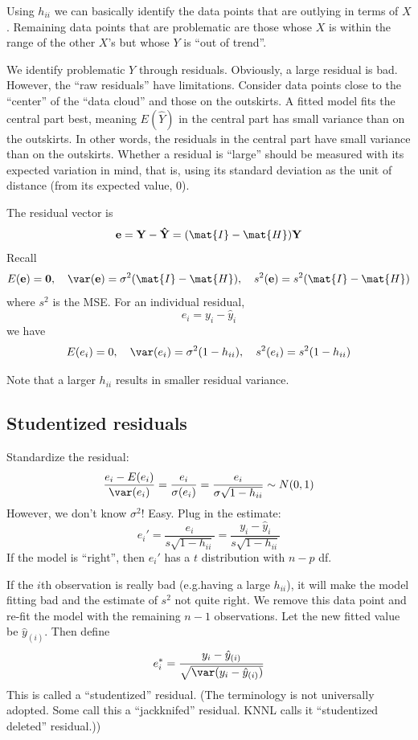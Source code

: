 \documentclass[12pt]{article}
\renewcommand\vec[1]{\ensuremath{\mathbf{#1}}}
\begin{document}
Using $h_{ii}$ we can basically identify the data points
that are outlying in terms of $X$.
Remaining data points that are problematic are those whose
$X$ is within the range of the other $X$'s but whose $Y$ is
``out of trend''.

We identify problematic $Y$ through residuals.
Obviously, a large residual is bad.
However, the ``raw residuals'' have limitations.
Consider data points close to the ``center'' of the ``data cloud''
and those on the outskirts.
A fitted model fits the central part best, meaning
$E(\hat{Y})$ in the central part has small variance
than on the outskirts.
In other words,
the residuals in the central part have small variance than on the
outskirts.
Whether a residual is ``large'' should be measured with its expected
variation in mind, that is, using its standard deviation as the unit of
distance (from its expected value, 0).

The residual vector is
\[
\vec{e} = \vec{Y} - \vec{\hat{Y}} = (\mat{I} - \mat{H})\vec{Y}
\]
Recall
\[
E(\vec{e}) = \vec{0},\quad
\var(\vec{e}) = \sigma^2 (\mat{I} - \mat{H}),\quad
s^2(\vec{e}) = s^2 (\mat{I} - \mat{H})
\]
where $s^2$ is the MSE.
For an individual residual,
\[
e_i = y_i - \hat{y}_i
\]
we have
\[
E(e_i) = 0,\quad
\var(e_i) = \sigma^2(1 - h_{ii}),\quad
s^2(e_i) = s^2 (1 - h_{ii})
\]

Note that a larger $h_{ii}$ results in smaller residual variance.

\subsection*{Studentized residuals}

Standardize the residual:
\[
\frac{e_i - E(e_i)}{\var(e_i)}
= \frac{e_i}{\sigma(e_i)}
= \frac{e_i}{\sigma \sqrt{1 - h_{ii}}}
\sim N(0, 1)
\]
However, we don't know $\sigma^2$!
Easy.  Plug in the estimate:
\[
e_i'
= \frac{e_i}{s\sqrt{1 - h_{ii}}}
= \frac{y_i - \hat{y}_i}{s\sqrt{1 - h_{ii}}}
\]
If the model is ``right'',
then $e_i'$ has a $t$ distribution with $n-p$ df.

If the $i$th observation is really bad
(e.g.\@ having a large $h_{ii}$),
it will make the model fitting bad
and the estimate of $s^2$ not quite right.
We remove this data point and re-fit the model
with the remaining $n-1$ observations.
Let the new fitted value be $\hat{y}_{(i)}$.
Then define
\[
e_i^*
= \frac{y_i - \hat{y}_{(i)}}
    {\sqrt{\var(y_i - \hat{y}_{(i)})}}
\]
This is called
a ``studentized'' residual.
(The terminology is not universally adopted.
Some call this a ``jackknifed'' residual.
KNNL calls it ``studentized deleted'' residual.))
\end{document}
